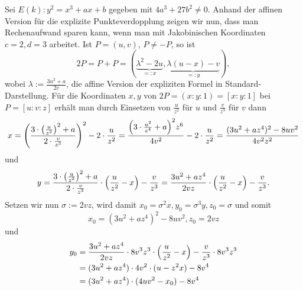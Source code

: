 \begin{anw}
	Sei $E(k)\colon y^2 = x^3 + ax + b$ gegeben mit $4a^3 + 27b^2 \neq 0$.
	Anhand der affinen Version für die explizite Punkteverdopplung zeigen wir nun, dass man Rechenaufwand sparen kann, wenn man mit Jakobinischen Koordinaten $c=2, d=3$ arbeitet.
	Ist $P = (u,v)$, $P \neq -P$, so ist
	\[
		2P = P+P =  (\underbrace{\lambda^2 - 2u}_{=:x}, \underbrace{\lambda(u-x) - v}_{=:y}),
	\]
	wobei $\lambda := \frac{3u^2+a}{2v}$, die affine Version der expliziten Formel in Standard-Darstellung.
	Für die Koordinaten $x,y$ von $2P = (x:y:1) = [x:y:1]$ bei $P=[u:v:z]$ erhält man durch Einsetzen von $\frac{u}{z^2}$ für $u$ und $\frac{v}{z^3}$ für $v$ dann
	\[
		x = \enbrace*{\frac{3 \cdot \enbrace*{ \frac{u}{z^2} }^2 + a}{2 \cdot \frac{v}{z^3}}}^2 - 2 \cdot \frac{u}{z^2} = \frac{\enbrace*{3 \cdot \frac{u^2}{z^4} + a}^2 z^6}{4v^2} - 2 \cdot \frac{u}{z^2} = \frac{(3u^2 + az^4)^2-8uv^2}{4v^2z^2}
	\]
	und
	\[
		y = \frac{3 \cdot \enbrace*{ \frac{u}{z^2}}^2 + a}{2 \cdot \frac{v}{z^3}} \cdot \enbrace*{\frac{u}{z^2} - x} - \frac{v}{z^3} = \frac{3u^2 + az^4}{2vz} \cdot \enbrace*{\frac{u}{z^2} - x} - \frac{v}{z^3}.
	\]
	Setzen wir nun $\sigma := 2vz$, wird damit $x_0 = \sigma^2 x, y_0 = \sigma^3 y, z_0 = \sigma$ und somit
	\[
		x_0 = (3u^2+az^4)^2 - 8uv^2, z_0 = 2vz
	\]
	und
	\begin{equation}
	\begin{aligned}
		y_0 &= \frac{3u^2+az^4}{2vz} \cdot 8v^3z^3 \cdot \enbrace*{\frac{u}{z^2} - x} - \frac{v}{z^3} \cdot 8v^3z^3 \\
		&= (3u^2 + az^4) \cdot 4v^2 \cdot(u-z^2x) - 8v^4 \\
		&= (3u^2 + az^4) \cdot (4uv^2 - x_0) - 8v^4
	\end{aligned}
	\end{equation}
\end{anw}

